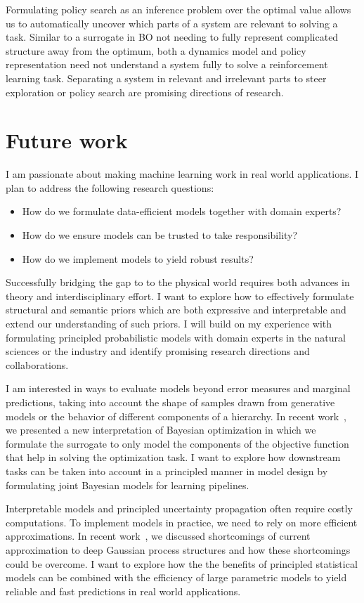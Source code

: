 Formulating policy search as an inference problem over the optimal value allows us to automatically uncover which parts of a system are relevant to solving a task.
Similar to a surrogate in BO not needing to fully represent complicated structure away from the optimum, both a dynamics model and policy representation need not understand a system fully to solve a reinforcement learning task.
Separating a system in relevant and irrelevant parts to steer exploration or policy search are promising directions of research.


\section{Future work}
\label{toc:discussion:future_work}
I am passionate about making machine learning work in real world applications.
I plan to address the following research questions:
\begin{itemize}
    \item How do we formulate data-efficient models together with domain experts?
    \item How do we ensure models can be trusted to take responsibility?
    \item How do we implement models to yield robust results?
\end{itemize}
Successfully bridging the gap to to the physical world requires both advances in theory and interdisciplinary effort.
I want to explore how to effectively formulate structural and semantic priors which are both expressive and interpretable and extend our understanding of such priors.
I will build on my experience with formulating principled probabilistic models with domain experts in the natural sciences or the industry and identify promising research directions and collaborations.

I am interested in ways to evaluate models beyond error measures and marginal predictions, taking into account the shape of samples drawn from generative models or the behavior of different components of a hierarchy.
In recent work~\parencite{bodin_modulating_2020}, we presented a new interpretation of Bayesian optimization in which we formulate the surrogate to only model the components of the objective function that help in solving the optimization task.
I want to explore how downstream tasks can be taken into account in a principled manner in model design by formulating joint Bayesian models for learning pipelines.

Interpretable models and principled uncertainty propagation often require costly computations.
To implement models in practice, we need to rely on more efficient approximations.
In recent work~\parencite{ustyuzhaninov_compositional_2020}, we discussed shortcomings of current approximation to deep Gaussian process structures and how these shortcomings could be overcome.
I want to explore how the the benefits of principled statistical models can be combined with the efficiency of large parametric models to yield reliable and fast predictions in real world applications.


